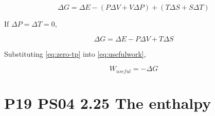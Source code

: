 \documentclass[9pt,a4paper,twocolumn]{article}
\begin{document}
\begin{enumerate}[(a)]
\begin{equation}
	\Delta G = \Delta E - \left( P\Delta V + V\Delta P \right) + \left( T\Delta S + S \Delta T \right)
\end{equation}

If $\Delta P = \Delta T = 0$,

\begin{equation}\label{eq:zero-tp}
	\Delta G = \Delta E - P\Delta V + T\Delta S
\end{equation}

Substituting \eqref{eq:zero-tp} into \eqref{eq:usefulwork},

\begin{equation}\label{answer-b}
	\boxed{
		W_{useful} = -\Delta G
	}
\end{equation}

\end{enumerate}

\section{P19 PS04 2.25 The enthalpy}
\end{document}
